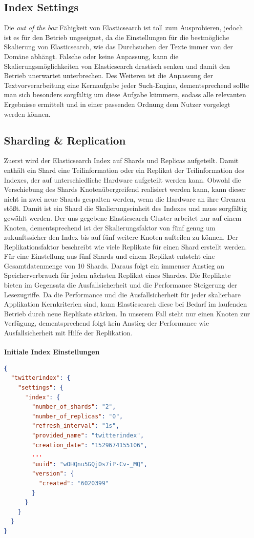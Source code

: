 \subsection{Index Settings}
Die \textit{out of the box} Fähigkeit von Elasticsearch ist toll zum Ausprobieren, jedoch ist es für den Betrieb ungeeignet, da die Einstellungen für die bestmögliche Skalierung von Elasticsearch, wie das Durchsuchen der Texte immer von der Domäne abhängt. Falsche oder keine Anpassung, kann die Skalierungsmöglichkeiten von Elasticsearch drastisch senken und damit den Betrieb unerwartet unterbrechen. Des Weiteren ist die Anpassung der Textvorverarbeitung eine Kernaufgabe jeder Such-Engine, dementsprechend sollte man sich besonders sorgfältig um diese Aufgabe kümmern, sodass alle relevanten Ergebnisse ermittelt und in einer passenden Ordnung dem Nutzer vorgelegt werden können.

\subsection{Sharding \& Replication}
Zuerst wird der Elasticsearch Index auf Shards und Replicas aufgeteilt. Damit enthält ein Shard eine Teilinformation oder ein Replikat der Teilinformation des Indexes, der auf unterschiedliche Hardware aufgeteilt werden kann. Obwohl die Verschiebung des Shards Knotenübergreifend realisiert werden kann, kann dieser nicht in zwei neue Shards gespalten werden, wenn die Hardware an ihre Grenzen stößt. Damit ist ein Shard die Skalierungseinheit des Indexes und muss sorgfältig gewählt werden. Der uns gegebene Elasticsearch Cluster arbeitet nur auf einem Knoten, dementsprechend ist der Skalierungsfaktor von fünf genug um zukunftssicher den Index bis auf fünf weitere Knoten aufteilen zu können. Der Replikationsfaktor beschreibt wie viele Replikate für einen Shard erstellt werden. Für eine Einstellung aus fünf Shards und einem Replikat entsteht eine Gesamtdatenmenge von 10 Shards. Daraus folgt ein immenser Anstieg an Speicherverbrauch für jeden nächsten Replikat eines Shardes. Die Replikate bieten im Gegensatz die Ausfallsicherheit und die Performance Steigerung der Lesezugriffe. Da die Performance und die Ausfallsicherheit für jeder skalierbare Applikation Kernkriterien sind, kann Elasticsearch diese bei Bedarf im laufenden Betrieb durch neue Replikate stärken. In unserem Fall steht nur einen Knoten zur Verfügung, dementsprechend folgt kein Anstieg der Performance wie Ausfallsicherheit mit Hilfe der Replikation.
\\\\
\textbf{Initiale Index Einstellungen}
\begin{lstlisting}[language=json,firstnumber=1]
{
  "twitterindex": {
    "settings": {
      "index": {
        "number_of_shards": "2",
        "number_of_replicas": "0",
        "refresh_interval": "1s",
        "provided_name": "twitterindex",
        "creation_date": "1529674155106",
        ...
        "uuid": "wOHQnu5GQjOs7iP-Cv-_MQ",
        "version": {
          "created": "6020399"
        }
      }
    }
  }
}
\end{lstlisting}

